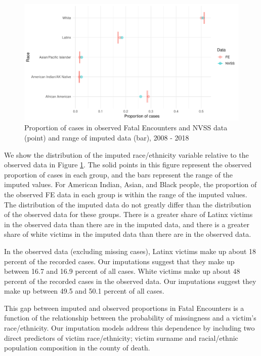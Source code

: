 \documentclass{article}
\begin{document}
\begin{figure}
	\centering
	\includegraphics[width = \linewidth]{vis/race_impute_pct.pdf}
	\caption{Proportion of cases in observed Fatal Encounters and NVSS data (point) and range of imputed data (bar), 2008 - 2018}
	\label{fig:race_impute_pct}
\end{figure}

We show the distribution of the imputed race/ethnicity variable relative to the observed data in Figure \ref{fig:race_impute_pct}. The solid points in this figure represent the observed proportion of cases in each group, and the bars represent the range of the imputed values. For American Indian, Asian, and Black people, the proportion of the observed FE data in each group is within the range of the imputed values. The distribution of the imputed data do not greatly differ than the distribution of the observed data for these groups. There is a greater share of Latinx victims in the observed data than there are in the imputed data, and there is a greater share of white victims in the imputed data than there are in the observed data. 

In the observed data (excluding missing cases), Latinx victims make up about 18 percent of the recorded cases. Our imputations suggest that they make up between 16.7 and 16.9 percent of all cases. White victims make up about 48 percent of the recorded cases in the observed data. Our imputations suggest they make up between 49.5 and 50.1 percent of all cases. 

This gap between imputed and observed proportions in Fatal Encounters is a function of the relationship between the probability of missingness and a victim's race/ethnicity. Our imputation models address this dependence by including two direct predictors of victim race/ethnicity; victim surname and racial/ethnic population composition in the county of death. 
\end{document}
